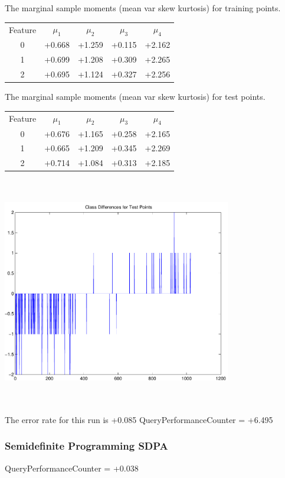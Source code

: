 \documentclass[9pt]{article}
\theoremstyle{plain}
\theoremstyle{definition}
\theoremstyle{remark}
\numberwithin{equation}{section}
\begin{document}
The marginal sample moments (mean var skew kurtosis) for training points.\newline
\begin{tabular}{ c |  c  c  c  c}
Feature & $\mu_1$ & $\mu_2$ & $\mu_3$ & $\mu_4$ \\
0 & +0.668 & +1.259 & +0.115& +2.162 \\
\hline
1 & +0.699 & +1.208 & +0.309& +2.265 \\
\hline
2 & +0.695 & +1.124 & +0.327& +2.256 \\
\hline
\end{tabular}
\newline
The marginal sample moments (mean var skew kurtosis) for test points.\newline
\begin{tabular}{ c | c  c  c  c}
Feature & $\mu_1$ & $\mu_2$ & $\mu_3$ & $\mu_4$ \\
0 & +0.676 & +1.165 & +0.258& +2.165\\
\hline
1 & +0.665 & +1.209 & +0.345& +2.269\\
\hline
2 & +0.714 & +1.084 & +0.313& +2.185\\
\hline
\end{tabular}\newline
\includegraphics[width=10.0cm,height=10.0cm]{classDiffs.pdf}

The error rate for this run is +0.085\newline
QueryPerformanceCounter  =  +6.495
\subsubsection{Semidefinite Programming SDPA}
QueryPerformanceCounter  =  +0.038
\end{document}
